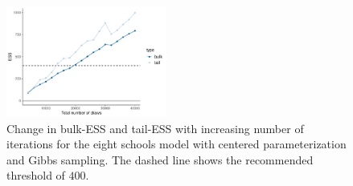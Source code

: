 \documentclass[american,]{article}
\theoremstyle{definition}
\begin{document}
\begin{figure}[tp]
  \centering
  \includegraphics[width=0.47\textwidth]{graphics/change-ess-jags-cp-tau-longer-1.pdf}
  \caption{Change in bulk-ESS and tail-ESS with increasing number of iterations for
  the eight schools model with centered parameterization and Gibbs sampling. The dashed line shows the
    recommended threshold of $400$.}
  \label{fig:change-ess-jags-cp-tau-longer-1}
\end{figure}
\end{document}
